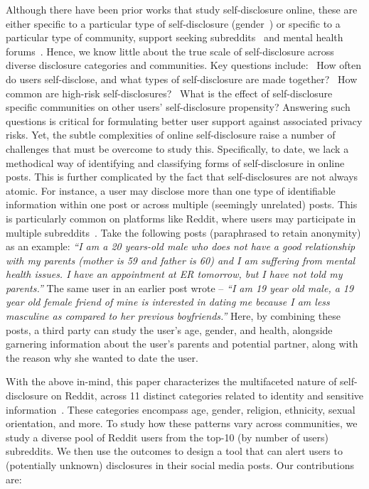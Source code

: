 Although there have been prior works that study self-disclosure online, these are either specific to a particular type of self-disclosure (\eg gender~\cite{mejova_gender_2023}) or specific to a particular type of community, \eg support seeking subreddits~\cite{chen_i_2024} and mental health forums~\cite{choudhury_mental_2014}.
Hence, we know little about the true scale of self-disclosure across diverse disclosure categories and communities.
Key questions include:
\one~How often do users self-disclose, and what types of self-disclosure are made together? 
\two~How common are high-risk self-disclosures? 
\three~What is the effect of self-disclosure specific communities on other users' self-disclosure propensity? Answering such questions is critical for formulating better user support against associated privacy risks.
Yet, the subtle complexities of online self-disclosure raise a number of challenges that must be overcome to study this. 
Specifically, to date, we lack a methodical way of identifying and classifying forms of self-disclosure in online posts. This is further complicated by the fact that self-disclosures are not always atomic. For instance, a user may disclose more than one type of identifiable information within one post or across multiple (seemingly unrelated) posts. This is particularly common on platforms like Reddit, where users may participate in multiple subreddits~\cite{crowley_expressive_2014}. 
Take the following posts (paraphrased to retain anonymity) as an example: \textit{``I am a 20 years-old male who does not have a good relationship with my parents (mother is 59 and father is 60) and I am suffering from mental health issues. I have an appointment at ER tomorrow, but I have not told my parents.''} The same user in an earlier post wrote -- \textit{``I am 19 year old male, a 19 year old female friend of mine is interested in dating me because I am less masculine as compared to her previous boyfriends.''} 
Here, by combining these posts, a third party can study the user's age, gender, and health, alongside garnering information about the user's parents and potential partner, along with the reason why she wanted to date the user. 



With the above in-mind, this paper characterizes the multifaceted nature of self-disclosure on Reddit, across 11 distinct categories related to identity and sensitive information~\cite{dou_reducing_2024}. These categories encompass age, gender, religion, ethnicity, sexual orientation, and more. 
To study how these patterns vary across communities, we study a diverse pool of Reddit users from the top-10 (by number of users) subreddits. We then use the outcomes to design a tool that can alert users to (potentially unknown) disclosures in their social media posts. Our contributions are:

